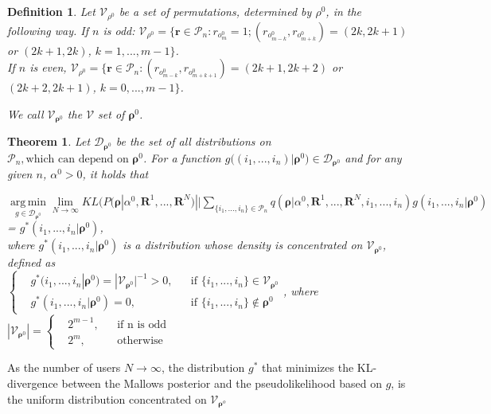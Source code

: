 \documentclass[11pt, oneside]{article}   	%
\newtheorem{theorem}{Theorem}[subsection]
\newtheorem{mydef}{Definition}
\begin{document}
\subsection{ }
\begin{mydef}{
Let $\mathcal{V}_{\rho^0}$ be a set of permutations, determined by $\rho^0$, in the following way. If $n$ is odd:
 $\mathcal{V}_{\rho^0} = \{\bm{r}\in \mathcal{P}_n: r_{o^0_m} = 1; (r_{o^0_{m-k}},r_{o^0_{m+k}}) = (2k, 2k+1) $ or $ (2k+1, 2k)$, $k = 1, ..., m-1\}$. \\
 If $n$ is even,  $\mathcal{V}_{\rho^0} = \{\bm{r}\in \mathcal{P}_n:(r_{o^0_{m-k}},r_{o^0_{m+k+1}}) = (2k+1, 2k+2) $ or $ (2k+2, 2k+1)$, $k = 0, ..., m-1\}$.
 
 We call $\mathcal{V}_{\bm{\rho}^0}$ the $\mathcal{V}$ set of $\bm{\rho}^0$.
}
\end{mydef}
\begin{theorem}\label{theorem:V}
Let	$\mathcal{D}_{\bm{\rho}^0}$ be the set of all distributions on $\mathcal{P}_n, \text{which can depend on } \bm{\rho}^0$. For a function $g\big((i_1, ..., i_n)|\bm{\rho}^0\big)\in\mathcal{D}_{\bm{\rho}^0}$ and for any given $n$, $\alpha^0 > 0$, it holds that

 $\operatorname*{arg\,min}\limits_{g\in\mathcal{D}_{\bm{\rho}^0}}\lim\limits_{N \rightarrow \infty} KL (P(\bm{\rho}|\alpha^0, \bm{R}^1, ...,\bm{R}^N ) || \sum\limits_{\{i_1,..., i_n\} \in \mathcal{P}_n} q ({\bm{\rho}}|\alpha^0, \bm{R}^1,..., \bm{R}^N, i_1,...,i_n) g(i_1,...,i_n|\bm{\rho}^0)$ \\
= $g^*(i_1,...,i_n|{{\bm{\rho}}^0})$, \\where
		$g^*(i_1, ..., i_n |{\bm{\rho}^0})$ is a distribution whose density is concentrated on $\mathcal{V}_{\bm{\rho}^0}$, defined as \\
		  $
		\left \{
		\begin{aligned}
		&g^*(i_1, ..., i_n | {\bm{\rho}^0}) = |\mathcal{V}_{\bm{\rho}^0}|^{-1}>0 , && \text{if } \{i_1,...,i_n\}\in \mathcal{V}_{\bm{\rho}^0}\\
		&g^*(i_1, ..., i_n | {\bm{\rho}^0}) = 0 , && \text{if } \{i_1,...,i_n\}\notin {\bm{\rho}^0}
		\end{aligned} \right.
		$, where $|\mathcal{V}_{\bm{\rho}^0}|
			= \left \{
			\begin{aligned}
			&2^{m-1}, && \text{if n is odd} \\
			&2^m, && \text{otherwise}
			\end{aligned} \right.
			$

\end{theorem}
As the number of users $N \rightarrow \infty$, the distribution $g^*$ that minimizes the KL-divergence between the Mallows posterior and the pseudolikelihood based on $g$, is the uniform distribution concentrated on $\mathcal{V}_{\bm{\rho}^o}$
\end{document}
